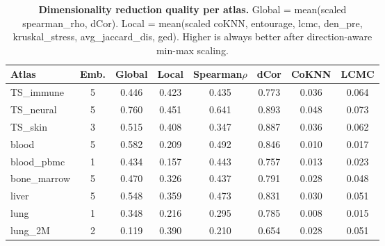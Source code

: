 
\begin{table}[htbp]
\centering
\caption{\textbf{Dimensionality reduction quality per atlas.}
Global = mean(scaled spearman\_rho, dCor). Local = mean(scaled coKNN, entourage, lcmc, den\_pre, kruskal\_stress, avg\_jaccard\_dis, ged).
Higher is always better after direction-aware min-max scaling.}
\label{tab:dimred_summary}
\small
\begin{tabular}{l c c c c c c c}
\toprule
\textbf{Atlas} & \textbf{Emb.} & \textbf{Global} & \textbf{Local} & \textbf{Spearman$\rho$} & \textbf{dCor} & \textbf{CoKNN} & \textbf{LCMC} \\
\midrule
TS\_immune & 5 & 0.446 & 0.423 & 0.435 & 0.773 & 0.036 & 0.064 \\
TS\_neural & 5 & 0.760 & 0.451 & 0.641 & 0.893 & 0.048 & 0.073 \\
TS\_skin & 3 & 0.515 & 0.408 & 0.347 & 0.887 & 0.036 & 0.062 \\
blood & 5 & 0.582 & 0.209 & 0.492 & 0.846 & 0.010 & 0.017 \\
blood\_pbmc & 1 & 0.434 & 0.157 & 0.443 & 0.757 & 0.013 & 0.023 \\
bone\_marrow & 5 & 0.470 & 0.326 & 0.437 & 0.791 & 0.028 & 0.048 \\
liver & 5 & 0.548 & 0.359 & 0.473 & 0.831 & 0.030 & 0.051 \\
lung & 1 & 0.348 & 0.216 & 0.295 & 0.785 & 0.008 & 0.015 \\
lung\_2M & 2 & 0.119 & 0.390 & 0.210 & 0.654 & 0.028 & 0.051 \\
\bottomrule
\end{tabular}
\end{table}
